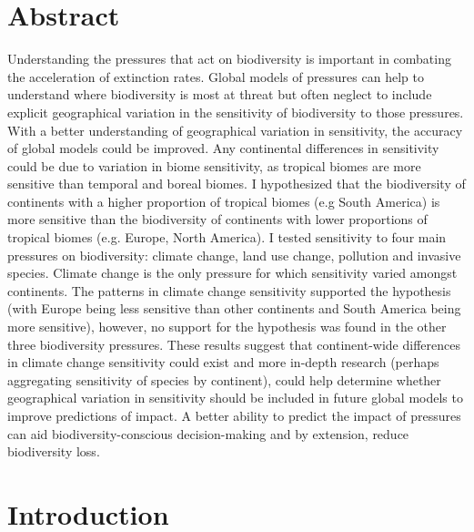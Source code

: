 \documentclass[11pt, a4paper, titlepage]{article}
\begin{document}
	\newpage
	
	\section*{Abstract}
	 Understanding the pressures that act on biodiversity is important in combating the acceleration of extinction rates. Global models of pressures can help to understand where biodiversity is most at threat but often neglect to include explicit geographical variation in the sensitivity of biodiversity to those pressures. With a better understanding of geographical variation in sensitivity, the accuracy of global models could be improved. Any continental differences in sensitivity could be due to variation in biome sensitivity, as tropical biomes are more sensitive than temporal and boreal biomes. I hypothesized that the biodiversity of continents with a higher proportion of tropical biomes (e.g South America) is more sensitive than the biodiversity of continents with lower proportions of tropical biomes (e.g. Europe, North America). I tested sensitivity to four main pressures on biodiversity: climate change, land use change, pollution and invasive species. Climate change is the only pressure for which sensitivity varied amongst continents. The patterns in climate change sensitivity supported the hypothesis (with Europe being less sensitive than other continents and South America being more sensitive), however, no support for the hypothesis was found in the other three biodiversity pressures. These results suggest that continent-wide differences in climate change sensitivity could exist and more in-depth research (perhaps aggregating sensitivity of species by continent), could help determine whether geographical variation in sensitivity should be included in future global models to improve predictions of impact. A better ability to predict the impact of pressures can aid biodiversity-conscious decision-making and by extension, reduce biodiversity loss. %
	
\newpage
\tableofcontents
\newpage
	
    \section*{Introduction}
    	
\end{document}
